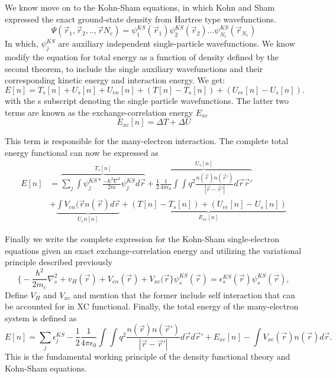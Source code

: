 We know move on to the Kohn-Sham equations, in which Kohn and Sham expressed the exact ground-state density from Hartree type wavefunctions. 
\begin{equation}
    \Psi(\vec{r}_1, \vec{r}_2 , .., \vec{r}{N_e}) = \psi_1^{KS}(\vec{r}_1)\psi_2^{KS}(\vec{r}_2)...\psi_{N_e}^{KS}(\vec{r}_{N_e})
\end{equation}
In which, $\psi_j^{KS}$ are auxiliary independent single-particle wavefunctions. We know modify the equation for total energy as a function of density defined by the second theorem, to include the single auxiliary wavefunctions and their corresponding kinetic energy and interaction energy. We get:
\begin{equation}
    E[n] = T_s[n] + U_s[n] + U_{en}[n] + (T[n] - T_s[n]) + (U_{ee}[n] - U_s[n]).
\end{equation}
with the s subscript denoting the single particle wavefunctions. The latter two terms are known as the exchange-correlation energy $E_{xc}$
\begin{equation}
    E_{xc}[n] = \Delta T + \Delta U
\end{equation}

This term is responsible for the many-electron interaction. The complete total energy functional can now be expressed as
\begin{equation}
    \begin{split}
    E[n] &= \overbrace{\sum_j \int \psi_j^{KS*}\frac{-\hbar^2 \nabla^2}{2m}\psi_j^{KS}d\vec{r}}^{T_s[n]} + \overbrace{\frac{1}{2}\frac{1}{4\pi \epsilon_0} \int \int q^2 \frac{n(\vec{r})n(\vec{r}')}{|\vec{r} - \vec{r}'|}d\vec{r}\vec{r}'}^{U_s[n]} \\ 
        &+ \underbrace{\int V_{en}(\vec{r}n(\vec{r})d\vec{r}}_{U_en[n]} + \underbrace{(T[n] - T_s[n]) + (U_{ee}[n] - U_s[n])}_{E_{xc}[n]}
    \end{split}
\end{equation}

Finally we write the complete expression for the Kohn-Sham single-electron equations given an exact exchange-correlation energy and utilizing the variational principle described previously
\begin{equation}
    \bigg\{ -\frac{\hbar^2}{2m_e}\nabla^2_s + v_H(\vec{r}) + V_{en}(\vec{r}) + V_{xc}(\vec{r} \bigg\}\psi_s^{KS}(\vec{r}) = \epsilon_s^{KS}(\vec{r})\psi_s^{KS}(\vec{r}),
\end{equation}
Define $V_H$ and $V_{xc}$ and mention that the former include self interaction that can be accounted for in XC functional. Finally, the total energy of the many-electron system is defined as
\begin{equation}
    E[n] = \sum_j \epsilon_j^{KS} - \frac{1}{2}\frac{1}{4\pi\epsilon_0} \int \int q^2 \frac{n(\vec{r})n(\vec{r}')}{|\vec{r} - \vec{r}'|}d\vec{r}d\vec{r}' + E_{xc}[n] - \int V_{xc}(\vec{r})n(\vec{r})d\vec{r}.
\end{equation}
This is the fundamental working principle of the density functional theory and Kohn-Sham equations.

